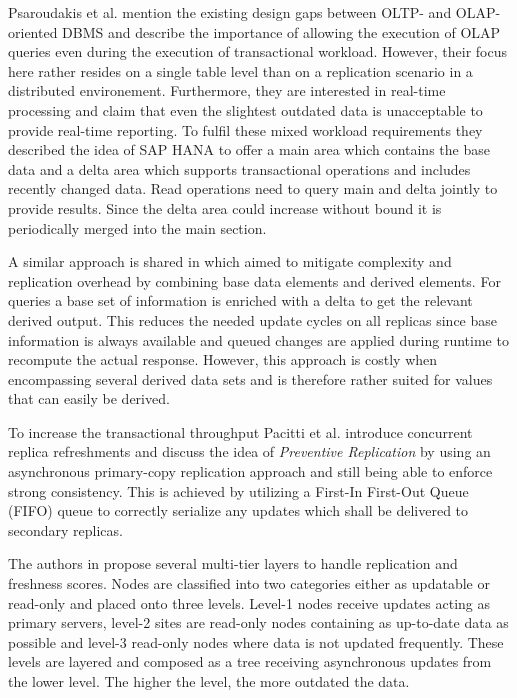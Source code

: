 Psaroudakis et al. \cite{psaroudakis:2015} mention the existing design gaps between OLTP- and OLAP-oriented DBMS and describe the importance of allowing the execution of
OLAP queries even during the execution of transactional workload. However, their focus here rather resides on a single table level than on a replication scenario in a distributed 
environement. Furthermore, they are interested in real-time processing and claim that even the slightest outdated data is unacceptable to provide real-time reporting.
To fulfil these mixed workload requirements they described the idea of SAP HANA to offer a main area which contains the base data and a delta area 
which supports transactional operations and includes recently changed data. Read operations need to query main and delta jointly to provide results. 
Since the delta area could increase without bound it is periodically merged into the main section. 


A similar approach is shared in \cite{wei:2004} which aimed to mitigate complexity and replication overhead by combining base data elements and derived elements.
For queries a base set of information is enriched with a delta to get the relevant derived output.
This reduces the needed update cycles on all replicas since base information is always available and queued changes are applied during runtime to recompute 
the actual response. However, this approach is costly when encompassing several derived data sets and is therefore rather suited for values that can 
easily be derived. 


To increase the transactional throughput \cite{pacitti:2005} Pacitti et al. introduce concurrent replica refreshments and discuss the idea of \emph{Preventive Replication} 
by using an asynchronous primary-copy replication approach and still being able to enforce strong consistency. This is achieved by utilizing a First-In First-Out Queue (FIFO) queue 
to correctly serialize any updates which shall be delivered to secondary replicas.

The authors in \cite{voicu:2010} propose several multi-tier layers to handle replication and freshness scores. Nodes are classified into two categories either as updatable or read-only
and placed onto three levels.
Level-1 nodes receive updates acting as primary servers, level-2 sites are read-only nodes containing as up-to-date data as possible and level-3 read-only nodes
where data is not updated frequently. These levels are layered and composed as a tree receiving asynchronous updates from the lower level. 
The higher the level, the more outdated the data.

